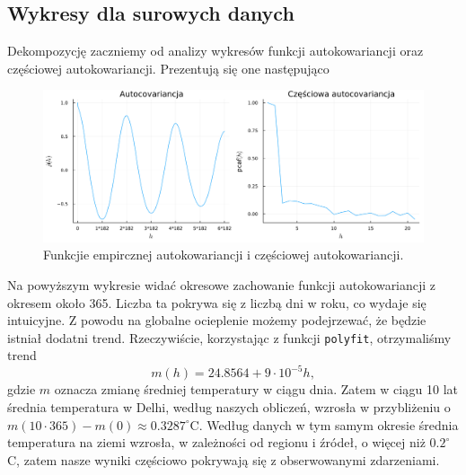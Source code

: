 \documentclass[12pt]{article}
\theoremstyle{exer}
\begin{document}
	\subsection{Wykresy dla surowych danych}
	Dekompozycję zaczniemy od analizy wykresów funkcji autokowariancji oraz częściowej autokowariancji. Prezentują się one następująco
	\begin{figure}[H]
		\includegraphics[width=\columnwidth]{Budnik/img/auto_dry.png}
		\caption{Funkcjie empircznej autokowariancji i częściowej autokowariancji.}\label{fig:dry_cov}
	\end{figure}
	Na powyższym wykresie widać okresowe zachowanie funkcji autokowariancji z okresem około 365. Liczba ta pokrywa się z liczbą dni w roku, co wydaje się intuicyjne. Z powodu na globalne ocieplenie możemy podejrzewać, że będzie istniał dodatni trend. Rzeczywiście, korzystając z funkcji \verb*|polyfit|, otrzymaliśmy trend
	\begin{equation}
		m(h)=24.8564+9\cdot10^{-5}h,
	\end{equation}  
	gdzie $m$ oznacza zmianę średniej temperatury w ciągu dnia. Zatem w ciągu 10 lat średnia temperatura w Delhi, według naszych obliczeń, wzrosła w przybliżeniu o $m(10\cdot365)-m(0)\approx0.3287^\circ$C. Według danych w tym samym okresie średnia temperatura na ziemi wzrosła, w zależności od regionu i źródeł, o więcej niż $0.2^\circ$C, zatem nasze wyniki częściowo pokrywają się z obserwowanymi zdarzeniami.
\end{document}
